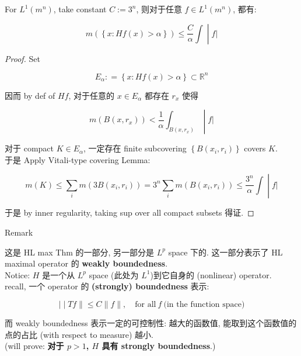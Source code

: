 \begin{theorem}{}

For \(L^{1}(m^{n})\), take constant \(C := 3^{n}\), 则对于任意 \(f \in L^{1}(m^{n})\), 都有:

\[\left. m(\left\{ {x:Hf(x) > \alpha} \right\}) \leq \frac{C}{\alpha}\int \middle| f| \right.\]

\end{theorem}

\begin{proof}

Set

\[E_{\alpha}: = \left\{ {x:Hf(x) > \alpha} \right\} \subset \mathbb{R}^{n}\]

因而 by def of \(Hf\), 对于任意的 \(x \in E_{\alpha}\) 都存在 \(r_{x}\) 使得

\[\left. m(B(x,r_{x})) < \frac{1}{\alpha}\int_{B(x,r_{x})} \middle| f| \right.\]

对于 compact \(K \in E_{\alpha}\), 一定存在 finite subcovering \(\left\{ {B(x_{i},r_{i})} \right\}\) covers \(K\).\\
于是 Apply Vitali-type covering Lemma:

\[\left. m(K) \leq \sum\limits_{i}m(3B(x_{i},r_{i})) = 3^{n}\sum\limits_{i}m(B(x_{i},r_{i})) \leq \frac{3^{n}}{\alpha}\int \middle| f| \right.\]

于是 by inner regularity, taking sup over all compact subsets 得证.

\end{proof}

\begin{qlremark}{Remark}

这是 HL max Thm 的一部分, 另一部分是 \(L^{p}\) space 下的. 这一部分表示了 HL maximal operator 的 \textbf{weakly boundedness}.\\
Notice: \(H\) 是一个从 \(L^{p}\) space (此处为 \(L^{1}\))到它自身的 (nonlinear) operator.\\
recall, 一个 operator 的 \textbf{(strongly) boundedness} 表示:

\[\left. | \middle| Tf \parallel \leq C \parallel f \parallel ,\quad\text{for all}\ f\ \text{(in the function space)} \right.\]

而 weakly boundedness 表示一定的可控制性: 越大的函数值, 能取到这个函数值的点的占比 (with respect to measure) 越小.\\
(will prove: \textbf{对于 \(p > 1\), \(H\) 具有 strongly boundedness}.)

\end{qlremark}

